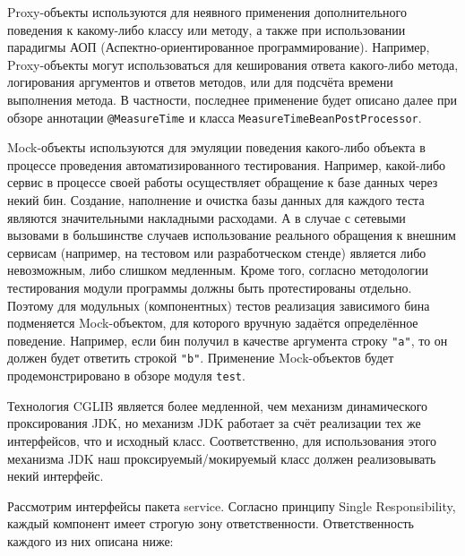 Proxy-объекты используются для неявного применения дополнительного поведения к какому-либо классу или методу, а также при использовании парадигмы АОП (Аспектно-ориентированное программирование).
Например, Proxy-объекты могут использоваться для кеширования ответа какого-либо метода, логирования аргументов и ответов методов, или для подсчёта времени выполнения метода.
В частности, последнее применение будет описано далее при обзоре аннотации \texttt{@MeasureTime} и класса \texttt{MeasureTimeBeanPostProcessor}.

Mock-объекты используются для эмуляции поведения какого-либо объекта в процессе проведения автоматизированного тестирования.
Например, какой-либо сервис в процессе своей работы осуществляет обращение к базе данных через некий бин.
Создание, наполнение и очистка базы данных для каждого теста являются значительными накладными расходами.
А в случае с сетевыми вызовами в большинстве случаев использование реального обращения к внешним сервисам (например, на тестовом или разработческом стенде) является либо невозможным, либо слишком медленным.
Кроме того, согласно методологии тестирования модули программы должны быть протестированы отдельно.
Поэтому для модульных (компонентных) тестов реализация зависимого бина подменяется Mock-объектом, для которого вручную задаётся определённое поведение.
Например, если бин получил в качестве аргумента строку \texttt{"a"}, то он должен будет ответить строкой \texttt{"b"}.
Применение Mock-объектов будет продемонстрировано в обзоре модуля \texttt{test}.

Технология CGLIB является более медленной, чем механизм динамического проксирования JDK, но механизм JDK работает за счёт реализации тех же интерфейсов, что и исходный класс.
Соответственно, для использования этого механизма JDK наш проксируемый/мокируемый класс должен реализовывать некий интерфейс.


Рассмотрим интерфейсы пакета service.
Согласно принципу Single Responsibility, каждый компонент имеет строгую зону ответственности.
Ответственность каждого из них описана ниже:

